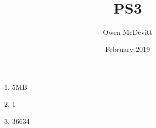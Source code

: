 \documentclass{article}
\title{PS3}
\author{Owen McDevitt}
\date{February 2019}
\begin{document}
\maketitle

\begin{enumerate}
    \item 5MB
    \item 1
    \item 36634
\end{enumerate}
\end{document}
